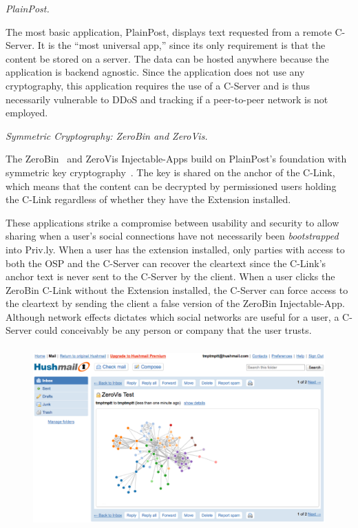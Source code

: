 \documentclass[letterpaper,twocolumn,10pt]{article}
\begin{document}
\begin{table}
\end{table}

\emph{PlainPost.}

The most basic application, PlainPost, 
displays text requested from a remote C-Server. It is the ``most universal app,''
since its only requirement is that the content be stored on a server. The data can be hosted anywhere because the application is backend agnostic. Since the
application does not use any cryptography, this application requires the use of
a C-Server and is thus necessarily vulnerable to DDoS and tracking if a peer-to-peer network is not employed.

\emph{Symmetric Cryptography: ZeroBin and ZeroVis.}

The ZeroBin~\cite{Sebsauvage2013} and ZeroVis Injectable-Apps 
build on PlainPost's foundation with symmetric key cryptography~\cite{Stark2009}. The key is 
shared on the anchor of the C-Link, which means that the content can be decrypted 
by permissioned users holding the C-Link regardless of whether they have the Extension installed.

These applications strike a compromise between usability 
and security to allow sharing when a user's social connections have not 
necessarily been \emph{bootstrapped} into Priv.ly. 
When a user has the extension installed, only parties with access to both the OSP and the C-Server can recover the cleartext since the C-Link's anchor text is never sent to the C-Server by the client.
When a user clicks the ZeroBin C-Link without the Extension installed, the C-Server can force access to the cleartext by sending the client a false version of the ZeroBin Injectable-App.
Although network effects dictates which social networks are useful for a user, a C-Server could conceivably be any person or company that the user trusts.

    \begin{figure}
        \begin{center}
        \includegraphics[height=70mm]{graphics/ZeroVisHushmail.eps}
        \label{fig:zerovis}
        \end{center}
        
    \end{figure}
\end{document}
